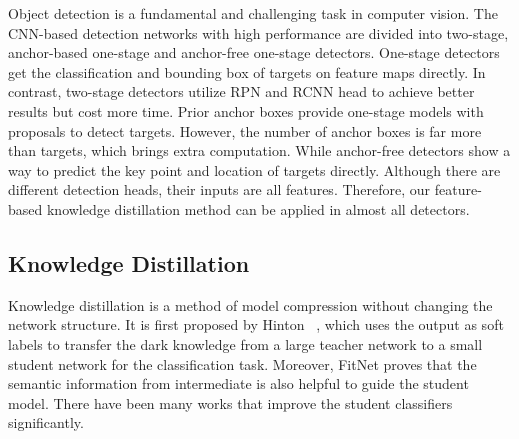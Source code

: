 \documentclass[10pt,twocolumn,letterpaper]{article}
\begin{document}
Object detection is a fundamental and challenging task in computer vision. The CNN-based detection networks with high performance are divided into two-stage\cite{ren2015faster,he2017mask,cai2018cascade}, anchor-based one-stage\cite{liu2016ssd,lin2017focal,redmon2018yolov3} and anchor-free one-stage detectors\cite{tian2019fcos,yang2019reppoints,duan2019centernet}. One-stage detectors get the classification and bounding box of targets on feature maps directly. In contrast, two-stage detectors utilize RPN and RCNN head to achieve better results but cost more time. Prior anchor boxes provide one-stage models with proposals to detect targets. However, the number of anchor boxes is far more than targets, which brings extra computation. While anchor-free detectors show a way to predict the key point and location of targets directly. Although there are different detection heads, their inputs are all features. Therefore, our feature-based knowledge distillation method can be applied in almost all detectors.

\subsection{Knowledge Distillation}
Knowledge distillation is a method of model compression without changing the network structure. It is first proposed by Hinton \etal~\cite{hinton2015distilling}, which uses the output as soft labels to transfer the dark knowledge from a large teacher network to a small student network for the classification task. Moreover, FitNet\cite{romero2014fitnets} proves that the semantic information from intermediate is also helpful to guide the student model. There have been many works\cite{zagoruyko2016paying, yim2017gift, heo2019comprehensive, tung2019similarity} that improve the student classifiers significantly.
\end{document}
